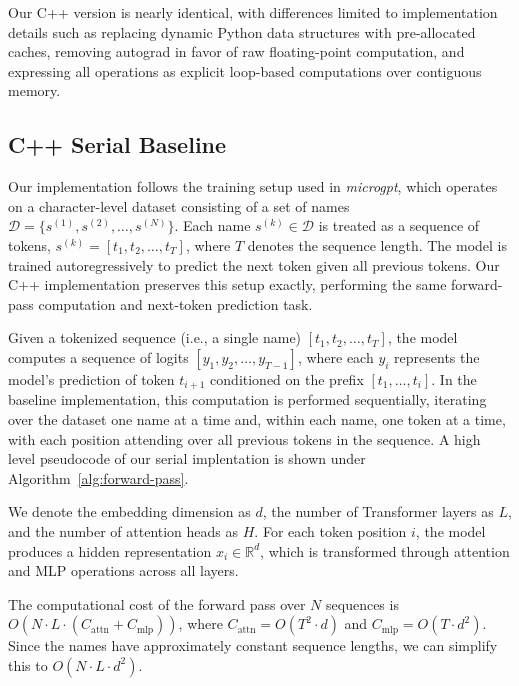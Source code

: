 Our C++ version is nearly identical, with differences limited to implementation details such as replacing dynamic Python data structures with pre-allocated caches, removing autograd in favor of raw floating-point computation, and expressing all operations as explicit loop-based computations over contiguous memory.

\subsection*{C++ Serial Baseline}
Our implementation follows the training setup used in \textit{microgpt}, which operates on a character-level dataset consisting of a set of names $\mathcal{D} = \{s^{(1)}, s^{(2)}, \dots, s^{(N)}\}$. Each name $s^{(k)} \in \mathcal{D}$ is treated as a sequence of tokens, $s^{(k)} = [t_1, t_2, \dots, t_T]$, where $T$ denotes the sequence length. The model is trained autoregressively to predict the next token given all previous tokens. Our C++ implementation preserves this setup exactly, performing the same forward-pass computation and next-token prediction task.  
 
Given a tokenized sequence (i.e., a single name) $[t_1, t_2, \dots, t_T]$, the model computes a sequence of logits $[y_1, y_2, \dots, y_{T-1}]$, where each $y_i$ represents the model's prediction of token $t_{i+1}$ conditioned on the prefix $[t_1, \dots, t_i]$. In the baseline implementation, this computation is performed sequentially, iterating over the dataset one name at a time and, within each name, one token at a time, with each position attending over all previous tokens in the sequence.  A high level pseudocode of our serial implentation is shown under Algorithm~\ref{alg:forward-pass}.

We denote the embedding dimension as $d$, the number of Transformer layers as $L$, and the number of attention heads as $H$. For each token position $i$, the model produces a hidden representation $x_i \in \mathbb{R}^d$, which is transformed through attention and MLP operations across all layers. 

The computational cost of the forward pass over $N$ sequences is $O\!\left(N \cdot L \cdot (C_{\text{attn}} + C_{\text{mlp}})\right)$, where $C_{\text{attn}} = O(T^2 \cdot d)$ and $C_{\text{mlp}} = O(T \cdot d^2)$. Since the names have approximately constant sequence lengths, we can simplify this to $O(N \cdot L \cdot d^2)$. 


